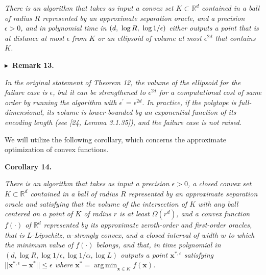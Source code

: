 \documentclass[10pt,a4paper]{article}
\begin{document}
\emph{There is an algorithm that takes as input a convex set $K\subset\mathbb{R}^{d}$ contained in a ball of radius $R$ represented by an approximate separation oracle, and a precision $\epsilon>0$, and in polynomial time in $\left(d,\nobreak\ \log R,\nobreak\ \log 1/\epsilon\right)$ either outputs a point that is at distance at most $\epsilon$ from $K$ or an ellipsoid of volume at most $\epsilon^{2d}$ that contains $K$.}\par







\par\medskip\noindent\textbf{
$\blacktriangleright$ Remark 13.
}\par



\emph{In the original statement of Theorem 12, the volume of the ellipsoid for the failure case is $\epsilon$, but it can be strengthened to $\epsilon^{2d}$ for a computational cost of same order by running the algorithm with $\epsilon^{\prime}=\epsilon^{2d}$. In practice, if the polytope is full-dimensional, its volume is lower-bounded by an exponential function of its encoding length (see [24, Lemma 3.1.35]), and the failure case is not raised.}\par






We will utilize the following corollary, which concerns the approximate optimization of convex functions.\par





\par\medskip\noindent\textbf{
\textbf{Corollary 14}\textbf{.}
}\par



\emph{There is an algorithm that takes as input a precision $\epsilon>0$, a closed convex set $K\subset\mathbb{R}^{d}$ contained in a ball of radius $R$ represented by an approximate separation oracle and satisfying that the volume of the intersection of $K$ with any ball centered on a point of $K$ of radius $r$ is at least $\Omega(r^{d})$, and a convex function $f(\cdot)$ of $\mathbb{R}^{d}$ represented by its approximate zeroth-order and first-order oracles, that is $L$-Lipschitz, $\alpha$-strongly convex, and a closed interval of width $w$ to which the minimum value of $f(\cdot)$ belongs, and that, in time polynomial in $(d,\log R,\log 1/\epsilon,\log 1/\alpha,\log L)$ outputs a point ${\boldsymbol{x}}^{*,\epsilon}$ satisfying $||{\boldsymbol{x}}^{*,\epsilon}-{\boldsymbol{x}}^{*}||\leq\epsilon$ where ${\boldsymbol{x}}^{*}=\operatorname*{arg\,min}_{{\boldsymbol{x}}\in K}f({\boldsymbol{x}})$.}\par
\end{document}

